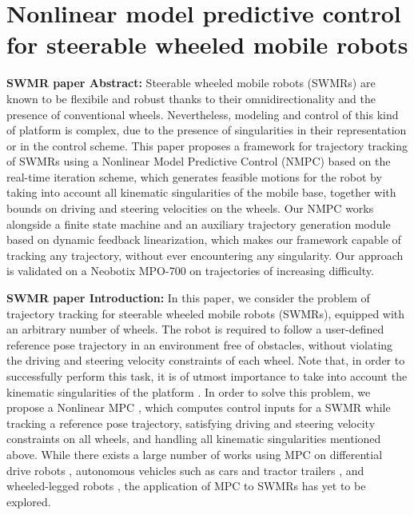 \chapter{Nonlinear model predictive control for steerable wheeled mobile robots}
\label{ch:nmpc-swmr}

\textbf{SWMR paper Abstract:}
Steerable wheeled mobile robots (SWMRs) are known to be flexibile and robust
thanks to their omnidirectionality and the presence of conventional wheels.
Nevertheless, modeling and control of this kind of platform is complex, due
to the presence of singularities in their representation or in the control
scheme. This paper proposes a framework for trajectory tracking of SWMRs using
a Nonlinear Model Predictive Control (NMPC) based on the real-time iteration
scheme, which generates feasible motions for the robot by taking into account
all kinematic singularities of the mobile base, together with bounds on driving
and steering velocities on the wheels. Our NMPC works alongside a finite state
machine and an auxiliary trajectory generation module based on dynamic feedback
linearization, which makes our framework capable of tracking any trajectory,
without ever encountering any singularity. Our approach is validated on a
Neobotix MPO-700 on trajectories of increasing difficulty.

\textbf{SWMR paper Introduction:}
In this paper, we consider the problem of trajectory tracking for steerable
wheeled mobile robots (SWMRs), equipped with an arbitrary number of wheels.
The robot is required to follow a user-defined reference pose trajectory in
an environment free of obstacles, without violating the driving and steering
velocity constraints of each wheel. Note that, in order to successfully perform
this task, it is of utmost importance to take into account the kinematic
singularities of the platform \cite{Sorour2019RAS}. In order to solve this
problem, we propose a Nonlinear MPC \cite{Rawlings2017MPCBook}, which computes
control inputs for a SWMR while tracking a reference pose trajectory,
satisfying driving and steering velocity constraints on all wheels, and handling
all kinematic singularities mentioned above. While there exists a large number
of works using MPC on differential drive robots \cite{Tarantos2023Springer},
autonomous vehicles such as cars \cite{Zanon2014Springer} and tractor trailers
\cite{Beglini2022TMECH}, and wheeled-legged robots \cite{Bjelonic2021IROS},
the application of MPC to SWMRs has yet to be explored.

